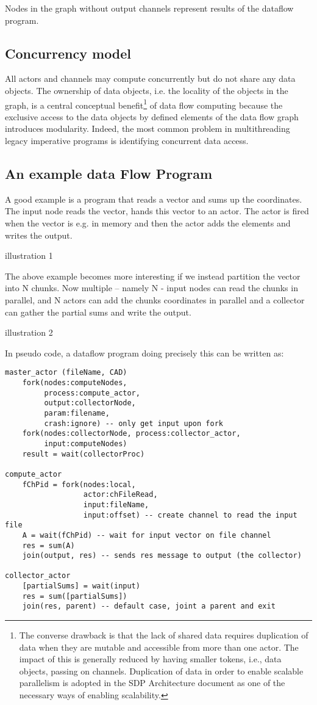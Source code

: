 \documentclass[11pt,a4paper]{article}
\begin{document}
Nodes in the graph without output channels represent results of the dataflow program.

\subsection{Concurrency model}
 
All actors and channels may compute concurrently but do not share any
data objects. The ownership of data objects, i.e. the locality of the
objects in the graph, is a central conceptual benefit\footnote{The
  converse drawback is that the lack of shared data requires
  duplication of data when they are mutable and accessible from more
  than one actor. The impact of this is generally reduced by having
  smaller tokens, i.e., data objects, passing on channels. Duplication
  of data in order to enable scalable parallelism is adopted in the
  SDP Architecture document as one of the necessary ways of enabling
  scalability.} of data flow computing because the exclusive access to
the data objects by defined elements of the data flow graph introduces
modularity. Indeed, the most common problem in multithreading legacy
imperative programs is identifying concurrent data access.


\subsection{An example data Flow Program}

A good example is a program that reads a vector and sums up the coordinates.  The input node reads the vector, hands this vector to an actor.  The actor is fired when the vector is e.g. in memory and then the actor adds the elements and writes the output.

illustration 1

The above example becomes more interesting if we instead partition the vector into N chunks. Now multiple – namely N - input nodes can read the chunks in parallel, and N actors can add the chunks coordinates in parallel and a collector can gather the partial sums and write the output.  

illustration 2

In pseudo code, a dataflow program doing precisely this can be written as:
\begin{lstlisting}
master_actor (fileName, CAD)
    fork(nodes:computeNodes, 
         process:compute_actor, 
         output:collectorNode, 
         param:filename, 
         crash:ignore) -- only get input upon fork
    fork(nodes:collectorNode, process:collector_actor, 
         input:computeNodes)
    result = wait(collectorProc)

compute_actor
    fChPid = fork(nodes:local, 
                  actor:chFileRead, 
                  input:fileName, 
                  input:offset) -- create channel to read the input file
    A = wait(fChPid) -- wait for input vector on file channel
    res = sum(A)
    join(output, res) -- sends res message to output (the collector)
 
collector_actor
    [partialSums] = wait(input)
    res = sum([partialSums])
    join(res, parent) -- default case, joint a parent and exit
\end{lstlisting}
\end{document}
